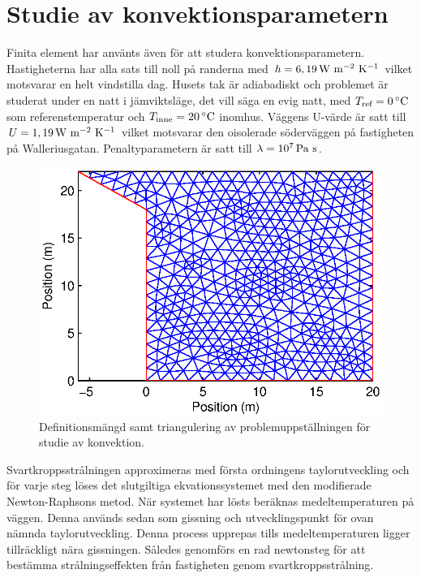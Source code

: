 \section{Studie av konvektionsparametern}

Finita element har använts även för att studera konvektionsparametern. Hastigheterna har alla
sats till noll på randerna med $h=\unit[6,19]{W~m^{-2}~K^{-1}}$ vilket motsvarar en helt vindstilla dag.
Husets tak är adiabadiskt
och problemet är studerat under en natt i jämviktsläge, det vill säga en evig natt, med
$T_\text{ref} = \unit[0]{^\circ C}$ som referenstemperatur och $T_\text{inne} = \unit[20]{^\circ C}$ inomhus.
Väggens U-värde är satt till $U = \unit[1,19]{W~m^{-2}~K^{-1}}$ vilket motsvarar den oisolerade söderväggen på fastigheten på Walleriusgatan. Penaltyparametern är satt till $\lambda = \unit[10^7]{Pa~s}$.

\begin{figure}
\centering
\includegraphics{images/triconvec.eps}
\caption{Definitionsmängd samt triangulering av problemuppställningen för studie av konvektion.}
\end{figure}

Svartkroppsstrålningen approximeras med första ordningens taylorutveckling och
för varje steg löses det slutgiltiga ekvationssystemet med den
modifierade Newton-Raphsons metod. När systemet har lösts beräknas
medeltemperaturen på väggen. Denna används sedan som gissning och utvecklingspunkt
för ovan nämnda taylorutveckling. Denna process upprepas tills medeltemperaturen
ligger tillräckligt nära gissningen. Således genomförs en rad newtonsteg
för att bestämma strålningseffekten från fastigheten genom svartkroppsstrålning.

